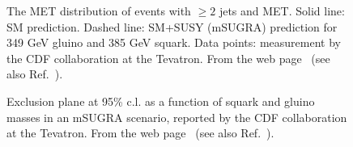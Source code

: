 \documentclass{ws-procs9x6}
\begin{document}
\begin{figure}
\begin{center}
\end{center}
\caption{The MET distribution of events with $\geq 2$ jets and MET. Solid line: SM prediction. Dashed line: SM+SUSY (mSUGRA) prediction for 349 GeV gluino and 385 GeV squark. Data points: measurement by the CDF collaboration at the Tevatron. From the web page~\cite{TeV_susy_web} (see also Ref.~\cite{TeV_susy}).}
\label{fig:TeV_susy_MET}
\end{figure}


\begin{figure}
\begin{center}
\end{center}
\caption{Exclusion plane at 95\% c.l. as a function of squark and gluino masses in an mSUGRA scenario, reported by the CDF collaboration at the Tevatron. From the web page~\cite{TeV_susy_web} (see also Ref.~\cite{TeV_susy}).}
\label{fig:TeV_susy_massbound}
\end{figure}
\end{document}
